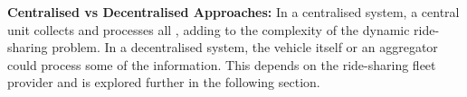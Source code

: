 \textbf{Centralised vs Decentralised Approaches:} In a centralised system, a central unit collects and processes all \cite{alonso2017demand}, adding to the complexity of the dynamic ride-sharing problem. In a decentralised system, the vehicle itself or an aggregator could process some of the information. This depends on the ride-sharing fleet provider and is explored further in the following section.






